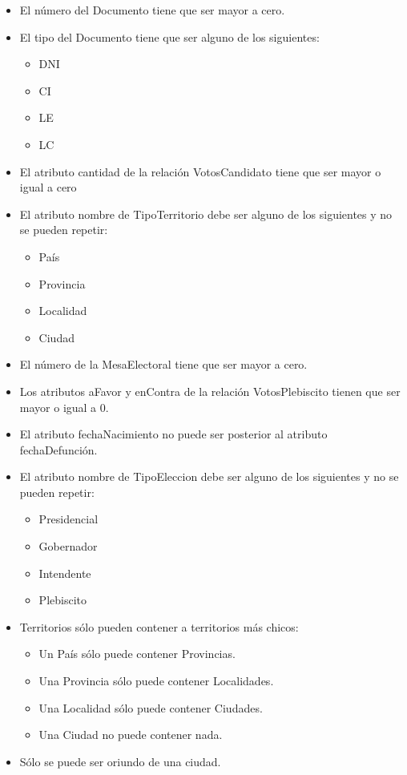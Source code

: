 \begin{itemize}
	\item{El número del Documento tiene que ser mayor a cero}.
	\item{El tipo del Documento tiene que ser alguno de los siguientes:
		\begin{itemize}
			\item{DNI}
			\item{CI}
			\item{LE}
			\item{LC}
		\end{itemize}
	}	
	\item{El atributo cantidad de la relación VotosCandidato tiene que ser mayor o igual a cero}

	\item{El atributo nombre de TipoTerritorio debe ser alguno de los siguientes y no se pueden repetir:
	  \begin{itemize}
	  	\item{País}
	  	\item{Provincia}
	  	\item{Localidad}
	  	\item{Ciudad}
	  \end{itemize}
	 }
	\item{El número de la MesaElectoral tiene que ser mayor a cero.}
	\item{Los  atributos aFavor y enContra de la relación VotosPlebiscito  tienen que ser mayor o igual a 0.}
	\item{El atributo fechaNacimiento no puede ser posterior al atributo fechaDefunción.}
\item{El atributo nombre de TipoEleccion debe ser alguno de los siguientes y no se pueden repetir:
	\begin{itemize}
		\item{Presidencial}
		\item{Gobernador}
		\item{Intendente}
		\item{Plebiscito}
	\end{itemize}
}

\item{Territorios sólo pueden contener a territorios más chicos:
\begin{itemize}
	\item{Un País sólo puede contener Provincias.}
	\item{Una Provincia sólo puede contener Localidades.}
	\item{Una Localidad sólo puede contener Ciudades.}
	\item{Una Ciudad no puede contener nada.}
\end{itemize}
}
\item{Sólo se puede ser oriundo de una ciudad.}


\end{itemize}
